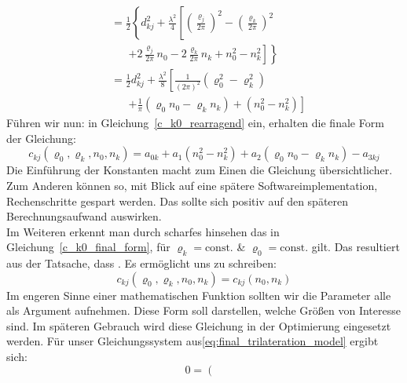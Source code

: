 {\begin{align}
%    
    &=\frac{1}{2}\left\{d_{kj}^2+\frac{\lambda^2}{4}\left[\left(\frac{\varrho_j}{2\pi}\right)^2-\left(\frac{\varrho_k}{2\pi}\right)^2 \right.\right.\nonumber\\
    &\phantom{=}\;
   	\left.\left.+2\frac{\varrho_j}{2\pi}n_0-2\frac{\varrho_k}{2\pi}n_k+n_0^2-n_k^2\right]\right\}\\
%	
	&=\frac{1}{2}d_{kj}^2+\frac{\lambda^2}{8}\left[\frac{1}{(2\pi)^2}\left(\varrho_0^2-\varrho_k^2\right) \right.\nonumber\\
	&\phantom{=}\;
	\left. +\frac{1}{\pi}\left(\varrho_0n_0-\varrho_kn_k\right)+\left(n_0^2-n_k^2\right)\right]\label{c_k0_rearragend}
\end{align}
%
Führen wir nun:
%
in Gleichung~\eqref{c_k0_rearragend} ein, erhalten die finale Form der Gleichung:
\begin{equation}
c_{kj}(\varrho_0, \varrho_k, n_0, n_k) = a_{0k}+a_1(n_0^2-n_k^2)+a_2(\varrho_0n_0-\varrho_kn_k)-a_{3kj}\label{c_k0_final_form}   
\end{equation}
%
Die Einführung der Konstanten macht zum Einen die Gleichung übersichtlicher. Zum Anderen können so, mit Blick auf eine spätere Softwareimplementation, Rechenschritte gespart werden. Das sollte sich positiv auf den späteren Berechnungsaufwand auswirken.\\
%
Im Weiteren erkennt man durch scharfes hinsehen das in Gleichung~\eqref{c_k0_final_form}, für $\varrho_k=\text{const.}$ \& $\varrho_0=\text{const.}$ gilt. Das resultiert aus der Tatsache, dass . Es ermöglicht uns zu schreiben:
\begin{equation}
c_{kj}(\varrho_0, \varrho_k, n_0, n_k) = c_{kj}(n_0, n_k)
\end{equation}
%
Im engeren Sinne einer mathematischen Funktion sollten wir die Parameter alle als Argument aufnehmen. Diese Form soll darstellen, welche Größen von Interesse sind. Im späteren Gebrauch wird diese Gleichung in der Optimierung eingesetzt werden.
Für unser Gleichungssystem aus\eqref{eq:final_trilateration_model} ergibt sich:
\begin{equation}\label{eq:wavenumber_trilateration_model}
0=
\left(
	\begin{array}{ccc}

\end{array}
\end{equation}}
